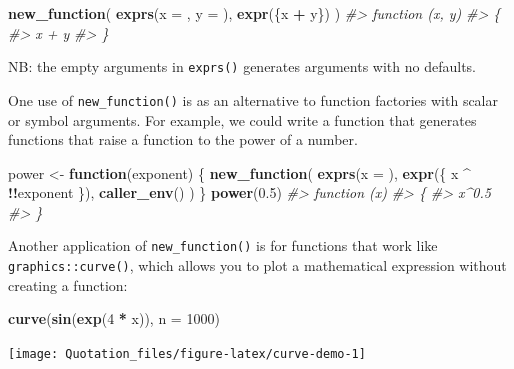 \documentclass[]{book}
\newenvironment{Shaded}{\begin{snugshade}}{\end{snugshade}}
\newcommand{\CommentTok}[1]{\textcolor[rgb]{0.37,0.37,0.37}{\textit{#1}}}
\newcommand{\ControlFlowTok}[1]{\textcolor[rgb]{0.27,0.27,0.27}{\textbf{#1}}}
\newcommand{\DataTypeTok}[1]{\textcolor[rgb]{0.27,0.27,0.27}{#1}}
\newcommand{\DecValTok}[1]{\textcolor[rgb]{0.06,0.06,0.06}{#1}}
\newcommand{\FloatTok}[1]{\textcolor[rgb]{0.06,0.06,0.06}{#1}}
\newcommand{\KeywordTok}[1]{\textcolor[rgb]{0.27,0.27,0.27}{\textbf{#1}}}
\newcommand{\NormalTok}[1]{#1}
\newcommand{\OperatorTok}[1]{\textcolor[rgb]{0.43,0.43,0.43}{\textbf{#1}}}
\newcommand{\StringTok}[1]{\textcolor[rgb]{0.5,0.5,0.5}{#1}}
\begin{document}
\begin{Shaded}
\begin{Highlighting}[]
\KeywordTok{new_function}\NormalTok{(}
  \KeywordTok{exprs}\NormalTok{(}\DataTypeTok{x =}\NormalTok{ , }\DataTypeTok{y =}\NormalTok{ ), }
  \KeywordTok{expr}\NormalTok{(\{x }\OperatorTok{+}\StringTok{ }\NormalTok{y\})}
\NormalTok{)}
\CommentTok{#> function (x, y) }
\CommentTok{#> \{}
\CommentTok{#>     x + y}
\CommentTok{#> \}}
\end{Highlighting}
\end{Shaded}

NB: the empty arguments in \texttt{exprs()} generates arguments with no defaults.

One use of \texttt{new\_function()} is as an alternative to function factories with scalar or symbol arguments. For example, we could write a function that generates functions that raise a function to the power of a number.

\begin{Shaded}
\begin{Highlighting}[]
\NormalTok{power <-}\StringTok{ }\ControlFlowTok{function}\NormalTok{(exponent) \{}
  \KeywordTok{new_function}\NormalTok{(}
    \KeywordTok{exprs}\NormalTok{(}\DataTypeTok{x =}\NormalTok{ ), }
    \KeywordTok{expr}\NormalTok{(\{}
\NormalTok{      x }\OperatorTok{^}\StringTok{ }\OperatorTok{!!}\NormalTok{exponent}
\NormalTok{    \}), }
    \KeywordTok{caller_env}\NormalTok{()}
\NormalTok{  )}
\NormalTok{\}}
\KeywordTok{power}\NormalTok{(}\FloatTok{0.5}\NormalTok{)}
\CommentTok{#> function (x) }
\CommentTok{#> \{}
\CommentTok{#>     x^0.5}
\CommentTok{#> \}}
\end{Highlighting}
\end{Shaded}

Another application of \texttt{new\_function()} is for functions that work like \texttt{graphics::curve()}, which allows you to plot a mathematical expression without creating a function:

\begin{Shaded}
\begin{Highlighting}[]
\KeywordTok{curve}\NormalTok{(}\KeywordTok{sin}\NormalTok{(}\KeywordTok{exp}\NormalTok{(}\DecValTok{4} \OperatorTok{*}\StringTok{ }\NormalTok{x)), }\DataTypeTok{n =} \DecValTok{1000}\NormalTok{)}
\end{Highlighting}
\end{Shaded}

\begin{center}\texttt{[image: Quotation\_files/figure-latex/curve-demo-1]} \end{center}
\end{document}
